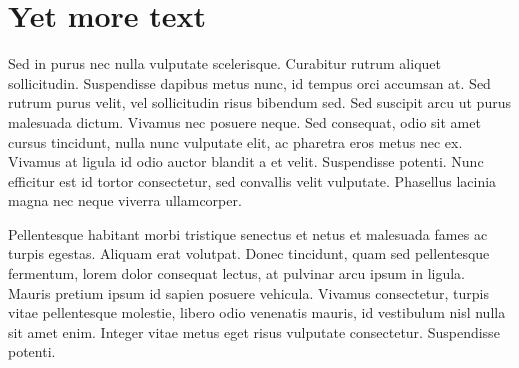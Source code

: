 \section{Yet more text}\label{s:ccl2}

Sed in purus nec nulla vulputate scelerisque. Curabitur rutrum aliquet sollicitudin. Suspendisse dapibus metus nunc, id tempus orci accumsan at. Sed rutrum purus velit, vel sollicitudin risus bibendum sed. Sed suscipit arcu ut purus malesuada dictum. Vivamus nec posuere neque. Sed consequat, odio sit amet cursus tincidunt, nulla nunc vulputate elit, ac pharetra eros metus nec ex. Vivamus at ligula id odio auctor blandit a et velit. Suspendisse potenti. Nunc efficitur est id tortor consectetur, sed convallis velit vulputate. Phasellus lacinia magna nec neque viverra ullamcorper.

Pellentesque habitant morbi tristique senectus et netus et malesuada fames ac turpis egestas. Aliquam erat volutpat. Donec tincidunt, quam sed pellentesque fermentum, lorem dolor consequat lectus, at pulvinar arcu ipsum in ligula. Mauris pretium ipsum id sapien posuere vehicula. Vivamus consectetur, turpis vitae pellentesque molestie, libero odio venenatis mauris, id vestibulum nisl nulla sit amet enim. Integer vitae metus eget risus vulputate consectetur. Suspendisse potenti.